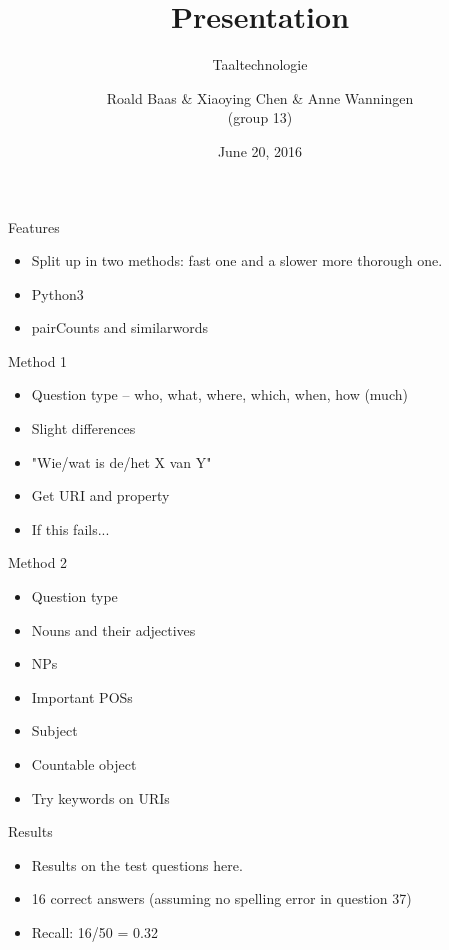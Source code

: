 \documentclass[pdf]{beamer}
\title{Presentation}
\subtitle{Taaltechnologie}
\author{Roald Baas \& Xiaoying Chen \& Anne Wanningen\\(group 13)}
\date{June 20, 2016}
\begin{document}
  \begin{frame}
    \titlepage
  \end{frame}


  \begin{frame}{Features}
    \begin{itemize}
      \item Split up in two methods: fast one and a slower more thorough one.
      \item Python3
      \item pairCounts and similarwords
    \end{itemize}
  \end{frame}
  
  \begin{frame}{Method 1}
    \begin{itemize}
      \item Question type -- who, what, where, which, when, how (much) %
      \item Slight differences
      \item "Wie/wat is de/het X van Y"
      \item Get URI and property
      \item If this fails...
    \end{itemize}
  \end{frame}
  
  \begin{frame}{Method 2}
    \begin{itemize}
      \item Question type %
      \item Nouns and their adjectives
      \item NPs %
      \item Important POSs %
      \item Subject
      \item Countable object
      \item Try keywords on URIs
    \end{itemize}
  \end{frame}
  
  \begin{frame}{Results}
    \begin{itemize}
      \item Results on the test questions here.
      \item 16 correct answers (assuming no spelling error in question 37)
      \item Recall: 16/50 = 0.32
    \end{itemize}
  \end{frame}
  
\end{document}
